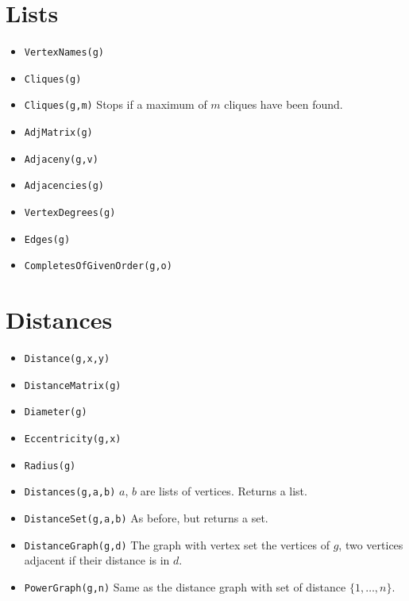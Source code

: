 \documentclass[11pt]{article}
\begin{document}
\begin{multicols}{3}
\section{Lists}
\label{sec:orgheadline10}
\begin{itemize}
\item \texttt{VertexNames(g)}
\item \texttt{Cliques(g)}
\item \texttt{Cliques(g,m)} Stops if a maximum of \(m\) cliques have been found.
\item \texttt{AdjMatrix(g)}
\item \texttt{Adjaceny(g,v)}
\item \texttt{Adjacencies(g)}
\item \texttt{VertexDegrees(g)}
\item \texttt{Edges(g)}
\item \texttt{CompletesOfGivenOrder(g,o)}
\end{itemize}

\section{Distances}
\label{sec:orgheadline11}
\begin{itemize}
\item \texttt{Distance(g,x,y)}
\item \texttt{DistanceMatrix(g)}
\item \texttt{Diameter(g)}
\item \texttt{Eccentricity(g,x)}
\item \texttt{Radius(g)}
\item \texttt{Distances(g,a,b)} \(a\), \(b\) are lists of vertices. Returns a list.
\item \texttt{DistanceSet(g,a,b)} As before, but returns a set.
\item \texttt{DistanceGraph(g,d)} The graph with vertex set the vertices of
\(g\), two vertices adjacent if their distance is in \(d\).
\item \texttt{PowerGraph(g,n)} Same as the distance graph with set of distance
\(\{1,\ldots,n\}\).
\end{itemize}

\end{multicols}
\end{document}
